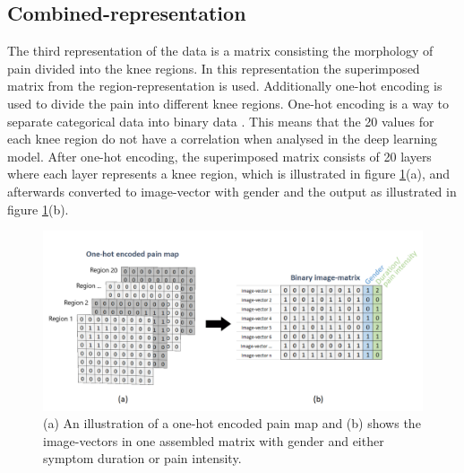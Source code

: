 \subsection{Combined-representation} \label{sec:combined}
The third representation of the data is a matrix consisting the morphology of pain divided into the knee regions.
\noindent
In this representation the superimposed matrix from the region-representation is used. Additionally one-hot encoding is used to divide the pain into different knee regions. One-hot encoding is a way to separate categorical data into binary data \citep{Harris2012}. This means that the 20 values for each knee region do not have a correlation when analysed in the deep learning model. After one-hot encoding, the superimposed matrix consists of 20 layers where each layer represents a knee region, which is illustrated in figure \ref{fig:onehot}(a), and afterwards converted to image-vector with gender and the output as illustrated in figure \ref{fig:onehot}(b).

\begin{figure} [H]
\centering
\includegraphics[width=1\textwidth]{figures/onehotmatrix}
\caption{(a) An illustration of a one-hot encoded pain map and (b) shows the image-vectors in one assembled matrix with gender and either symptom duration or pain intensity.}
\label{fig:onehot}
\end{figure}

